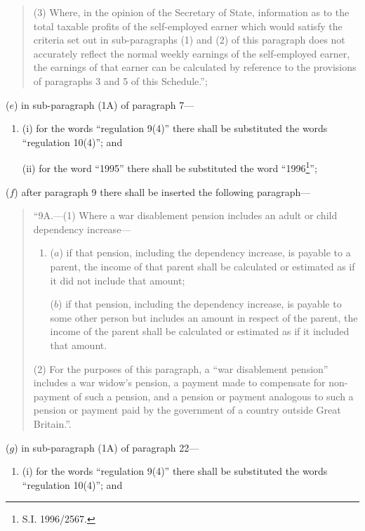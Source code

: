 \documentclass[12pt,a4paper]{article}
\begin{document}
\begin{enumerate}
\begin{quotation}
(3) Where, in the opinion of the 
Secretary of State,  %
information as to the total taxable profits of the self-employed earner which would satisfy the criteria set out in sub-paragraphs (1) and (2) of this paragraph does not accurately reflect the normal weekly earnings of the self-employed earner, the earnings of that earner can be calculated by reference to the provisions of paragraphs 3 and 5 of this Schedule.”;
\end{quotation}

($e$) in sub-paragraph (1A) of paragraph 7—
\begin{enumerate}\item[]
(i) for the words “regulation 9(4)” there shall be substituted the words “regulation 10(4)”; and

(ii) for the word “1995” there shall be substituted the word “1996\footnote{\frenchspacing S.I. 1996/2567.}”;
\end{enumerate}

($f$) after paragraph 9 there shall be inserted the following paragraph—
\begin{quotation}
“9A.—(1) Where a war disablement pension includes an adult or child dependency increase—
\begin{enumerate}\item[]
($a$) if that pension, including the dependency increase, is payable to a parent, the income of that parent shall be calculated or estimated as if it did not include that amount;

\begin{sloppypar}
($b$) if that pension, including the dependency increase, is payable to some other person but includes an amount in respect of the parent, the income of the parent shall be calculated or estimated as if it included that amount.
\end{sloppypar}
\end{enumerate}

(2) For the purposes of this paragraph, a “war disablement pension” includes a war widow’s pension, a payment made to compensate for non-payment of such a pension, and a pension or payment analogous to such a pension or payment paid by the government of a country outside Great Britain.”.
\end{quotation}

($g$) in sub-paragraph (1A) of paragraph 22—
\begin{enumerate}\item[]
(i) for the words “regulation 9(4)” there shall be substituted the words “regulation 10(4)”; and


\end{enumerate}
\end{enumerate}
\end{document}
